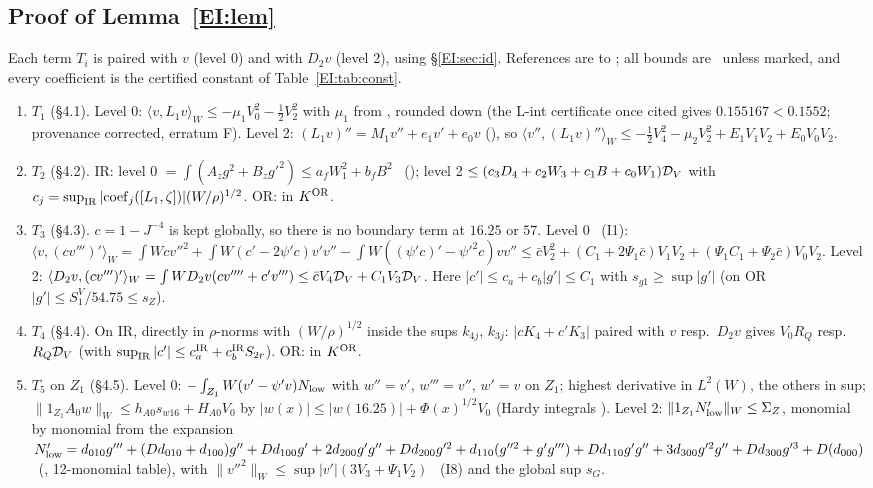 \documentclass[11pt]{article}
\begin{document}
\subsection{Proof of Lemma~\ref{EI:lem}}\label{EI:sec:proof}
Each term $T_i$ is paired with $v$ (level 0) and with $D_2v$ (level 2), using \S\ref{EI:sec:id}. References are to ; all bounds are \tHd\ unless marked, and every coefficient is the certified constant of Table~\ref{EI:tab:const}.
\begin{enumerate}[label=\textup{(\roman*)},leftmargin=2.2em]
\item $T_1$ (\S4.1). Level 0: $\langle v,L_1v\rangle_W\le-\mu_1V_0^2-\frac12V_2^2$ with $\mu_1$ from , rounded down (the L-int certificate once cited gives $0.155167<0.1552$; provenance corrected, erratum F). Level 2: $(L_1v)''=M_1v''+e_1v'+e_0v$ (), so $\langle v'',(L_1v)''\rangle_W\le-\frac12V_4^2-\mu_2V_2^2+E_1V_1V_2+E_0V_0V_2$.
\item $T_2$ (\S4.2). IR: level 0 $=\int(A_zg^2+B_zg'^2)\le a_fW_1^2+b_fB^2$ \tC\ (); level 2 $\le(c_3D_4+c_2W_3+c_1B+c_0W_1)\mathcal D_V$ with $c_j=\sup_{\rm IR}|{\rm coef}_j([L_1,\zeta])|(W/\rho)^{1/2}$. OR: in $K^{\mathrm{OR}}$.
\item $T_3$ (\S4.3). $c=1-J^{-4}$ is kept globally, so there is no boundary term at $16.25$ or $57$. Level 0 \tS\ (I1): $\langle v,(cv''')'\rangle_W=\int Wcv''^2+\int W(c'-2\psi'c)v'v''-\int W((\psi'c)'-\psi'^2c)vv''\le\bar cV_2^2+(C_1+2\Psi_1\bar c)V_1V_2+(\Psi_1C_1+\Psi_2\bar c)V_0V_2$. Level 2: $\langle D_2v,(cv''')'\rangle_W=\int WD_2v(cv''''+c'v''')\le\bar cV_4\mathcal D_V+C_1V_3\mathcal D_V$. Here $|c'|\le c_a+c_b|g'|\le C_1$ with $s_{g1}\ge\sup|g'|$ (on OR $|g'|\le S^V_1/54.75\le s_Z$).
\item $T_4$ (\S4.4). On IR, directly in $\rho$-norms with $(W/\rho)^{1/2}$ inside the sups $k_{4j}$, $k_{3j}$: $|cK_4+c'K_3|$ paired with $v$ resp.\ $D_2v$ gives $V_0R_Q$ resp.\ $R_Q\mathcal D_V$ (with $\sup_{\rm IR}|c'|\le c^{\rm IR}_a+c^{\rm IR}_bS_{2r}$). OR: in $K^{\mathrm{OR}}$.
\item $T_5$ on $Z_1$ (\S4.5). Level 0: $-\int_{Z_1}W(v'-\psi'v)N_{\rm low}$ with $w''=v'$, $w'''=v''$, $w'=v$ on $Z_1$; highest derivative in $L^2(W)$, the others in sup; $\|1_{Z_1}A_0w\|_W\le h_{A0}s_{w16}+H_{A0}V_0$ by $|w(x)|\le|w(16.25)|+\Phi(x)^{1/2}V_0$ (Hardy integrals ). Level 2: $\|1_{Z_1}N_{\rm low}'\|_W\le\Sigma_Z$, monomial by monomial from the expansion $N_{\rm low}'=d_{010}g'''+(Dd_{010}+d_{100})g''+Dd_{100}g'+2d_{200}g'g''+Dd_{200}g'^2+d_{110}(g''^2+g'g''')+Dd_{110}g'g''+3d_{300}g'^2g''+Dd_{300}g'^3+D(d_{000})$ \tS\ (, 12-monomial table), with $\|v''^2\|_W\le\sup|v'|(3V_3+\Psi_1V_2)$ \tS\ (I8) and the global sup $s_G$.

\end{enumerate}
\end{document}
